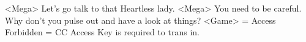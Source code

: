 <Mega> Let's go talk to that Heartless lady. 
<Mega> You need to be careful. Why don't you pulse out and have a look at things? 
<Game> = Access Forbidden = CC Access Key is required to trans in. 
